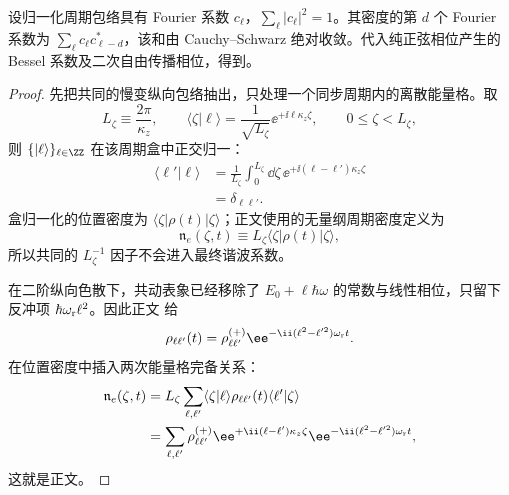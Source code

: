 \begin{proposition}
设归一化周期包络具有 Fourier 系数 $c_\ell$，$\sum_\ell|c_\ell|^2=1$。其密度的第 $d$ 个 Fourier 系数为 $\sum_\ell c_\ell c_{\ell-d}^*$，该和由 Cauchy--Schwarz 绝对收敛。代入纯正弦相位产生的 Bessel 系数及二次自由传播相位，得到。
\end{proposition}
\begin{proof}
先把共同的慢变纵向包络抽出，只处理一个同步周期内的离散能量格。取
\[
L_\zeta\equiv\frac{2\pi}{\kappa_z},
\qquad
\langle\zeta|\ell\rangle
=\frac{1}{\sqrt{L_\zeta}}
\ee^{+\ii\ell\kappa_z\zeta},
\qquad 0\le\zeta<L_\zeta,
\]
则 $\{|\ell\rangle\}_{\ell\in\ZZ}$ 在该周期盒中正交归一：
\begin{align*}
\langle\ell'|\ell\rangle
&=\frac1{L_\zeta}
\int_0^{L_\zeta}\dd\zeta\,
\ee^{+\ii(\ell-\ell')\kappa_z\zeta}\\
&=\delta_{\ell\ell'}.
\end{align*}
盒归一化的位置密度为
$\langle\zeta|\rho(t)|\zeta\rangle$；正文使用的无量纲周期密度定义为
\[
\mathfrak n_e(\zeta,t)
\equiv L_\zeta\langle\zeta|\rho(t)|\zeta\rangle,
\]
所以共同的 $L_\zeta^{-1}$ 因子不会进入最终谐波系数。

在二阶纵向色散下，共动表象已经移除了 $E_0+\ell\hbar\omega$ 的常数与线性相位，只留下反冲项 $\hbar\omega_{\rm r}\ell^2$。因此正文 给
\[
\rho_{\ell\ell'}(t)
=\rho_{\ell\ell'}^{(+)}
\ee^{-\ii(\ell^2-\ell'^2)\omega_{\rm r}t}.
\]
在位置密度中插入两次能量格完备关系：
\begin{align*}
\mathfrak n_e(\zeta,t)
&=L_\zeta
\sum_{\ell,\ell'}
\langle\zeta|\ell\rangle
\rho_{\ell\ell'}(t)
\langle\ell'|\zeta\rangle\\
&=\sum_{\ell,\ell'}
\rho_{\ell\ell'}^{(+)}
\ee^{+\ii(\ell-\ell')\kappa_z\zeta}
\ee^{-\ii(\ell^2-\ell'^2)\omega_{\rm r}t},
\end{align*}
这就是正文。


\end{proof}
